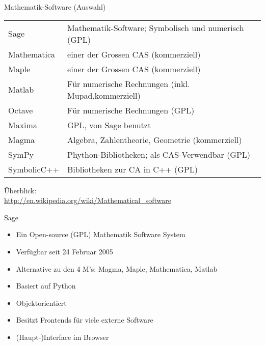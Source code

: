 \documentclass[hyperref={xetex}]{beamer}
\begin{document}
\begin{frame}{Mathematik-Software (Auswahl)}
\begin{small}
\begin{block}{}
\begin{tabular}{ll}
\alert{Sage} & Mathematik-Software; Symbolisch und numerisch (GPL)\\
\alert{Mathematica} &einer der Grossen CAS (kommerziell)\\
 \alert{Maple} &einer der Grossen CAS (kommerziell)\\
\alert{Matlab} &Für numerische Rechnungen (inkl. Mupad,kommerziell)\\
\alert{Octave} &Für numerische Rechnungen (GPL)\\
 \alert{Maxima} & GPL, von Sage benutzt\\
\alert{Magma} & Algebra, Zahlentheorie, Geometrie (kommerziell)\\
 \alert{SymPy} &Phython-Bibliotheken; als CAS-Verwendbar (GPL)\\
 \alert{SymbolicC++} &Bibliotheken zur CA in C++ (GPL)
\end{tabular}

\medskip
Überblick:\\{\scriptsize
\url{http://en.wikipedia.org/wiki/Mathematical_software} }
\end{block}

\end{small}
\end{frame}

\begin{frame}{Sage}
\begin{itemize}
\item Ein Open-source (GPL) Mathematik Software System
\item Verfügbar seit 24 Februar 2005
\item Alternative zu den 4 M's: Magma, Maple, Mathematica, Matlab
\item Basiert auf Python
\item Objektorientiert
\item Besitzt Frontends für viele externe Software 
\item (Haupt-)Interface im Browser
\end{itemize}
\end{frame}
\end{document}
